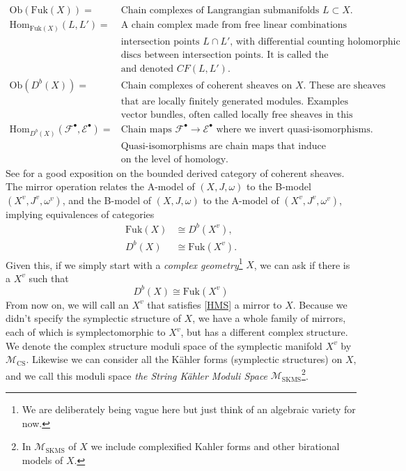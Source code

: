 \documentclass[oneside]{amsart}
\theoremstyle{definition}
\theoremstyle{definition}
\theoremstyle{definition}
\theoremstyle{definition}
\newcommand{\Es}{\mathcal{E}}
\newcommand{\Fs}{\mathcal{F}}
\begin{document}
\begin{align*}
    \text{Ob}(\text{Fuk}(X)) =& \text{Chain complexes of Langrangian submanifolds }L \subset X. \\
    \text{Hom}_{\text{Fuk}(X)}(L,L') =& \text{A chain complex made from free linear combinations of} \\
    &\text{intersection points $L \cap L'$, with differential counting holomorphic} \\
    &\text{discs between intersection points. It is called the Floer complex} \\
    &\text{and denoted } CF(L,L'). \\
    \text{Ob}(D^b(X)) =& \text{Chain complexes of coherent sheaves on } X.\text{ These are sheaves} \\
    &\text{that are locally finitely generated modules. Examples include } \\
    &\text{vector bundles, often called locally free sheaves in this context.} \\
    \text{Hom}_{D^b(X)}(\Fs^{\bullet},\Es^{\bullet}) =& \text{Chain maps $\Fs^{\bullet} \to \Es^{\bullet}$ where we invert quasi-isomorphisms.} \\
    &\text{Quasi-isomorphisms are chain maps that induce isomorphisms} \\
    &\text{on the level of homology.}
\end{align*}
See \cite[Chapter 2]{huybrechts} for a good exposition on the bounded derived category of coherent sheaves. The mirror operation relates the A-model of $(X,J,\omega)$ to the B-model $(X^{v},J^{v},\omega^{v})$, and the B-model of $(X,J,\omega)$ to the A-model of $(X^{v},J^{v},\omega^{v})$, implying equivalences of categories
\begin{align*}
    \text{Fuk}(X) &\cong D^b(X^{v}), \\
     D^b(X) &\cong \text{Fuk}(X^{v}).
\end{align*}
Given this, if we simply start with a \textit{complex geometry}\footnote{We are deliberately being vague here but just think of an algebraic variety for now.} $X$, we can ask if there is a  $X^{v}$ such that 
\begin{equation}
D^b(X) \cong \text{Fuk}(X^{v})
\label{HMS}
\end{equation}
From now on, we will call an $X^v$ that satisfies \eqref{HMS} a mirror to $X$. Because we didn't specify the symplectic structure of $X$, we have a whole family of mirrors, each of which is symplectomorphic to $X^v$, but has a different complex structure. We denote the complex structure moduli space of the symplectic manifold $X^v$ by $\mathcal{M}_{\text{CS}}$. Likewise we can consider all the Kähler forms (symplectic structures) on $X$, and we call this moduli space \textit{the String Kähler Moduli Space} $\mathcal{M}_{\text{SKMS}}$\footnote{In $\mathcal{M}_{\text{SKMS}}$ of $X$ we include complexified Kahler forms and other birational models of $X$.}.\\
\end{document}
